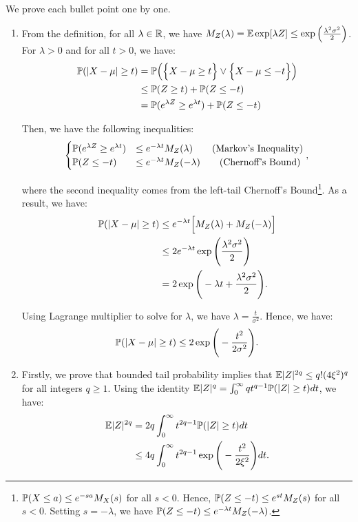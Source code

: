\begin{proof*}
	We prove each bullet point one by one.
	\begin{enumerate}[label=(\roman*)]
		\item From the definition, for all $\lambda\in\mathbb{R}$, we have $M_Z(\lambda) = \mathbb{E}\exp[\lambda Z] \le \exp\Big( \frac{\lambda^2\sigma^2}{2} \Big)$. For $\lambda>0$ and for all $t>0$, we have:
		\begin{align*}
			\mathbb{P}(|X-\mu| \ge t) &= \mathbb{P}\Big( \Big\{ X - \mu \ge t \Big\} \vee \Big\{ X - \mu \le -t \Big\} \Big) \\
			&\le \mathbb{P}(Z \ge t) + \mathbb{P}(Z\le -t) \\
			&= \mathbb{P}(e^{\lambda Z} \ge e^{\lambda t}) + \mathbb{P}(Z \le -t)
		\end{align*} 

		\noindent Then, we have the following inequalities:
		\begin{align*}
			\begin{cases}
				\mathbb{P}(e^{\lambda Z} \ge e^{\lambda t}) &\le e^{-\lambda t}M_Z(\lambda) \qquad \text{(Markov's Inequality)} \\
				\mathbb{P}(Z \le -t) &\le e^{-\lambda t} M_Z(-\lambda) \qquad \text{(Chernoff's Bound)}
			\end{cases},
		\end{align*} 

		\noindent where the second inequality comes from the left-tail Chernoff's Bound\footnote{$\mathbb{P}(X\le a)\le e^{-sa}M_X(s)$ for all $s<0$. Hence, $\mathbb{P}(Z\le -t)\le e^{st}M_Z(s)$ for all $s<0$. Setting $s=-\lambda$, we have $\mathbb{P}(Z\le -t) \le e^{-\lambda t}M_Z(-\lambda)$.}. As a result, we have:
		\begin{align*}
			\mathbb{P}(|X-\mu|\ge t) &\le e^{-\lambda t}\Big[ M_Z(\lambda) + M_Z(-\lambda) \Big] \\
				&\le 2e^{-\lambda t} \exp\Bigg( \frac{\lambda^2\sigma^2}{2} \Bigg) \\
				&= 2\exp\Bigg( -\lambda t + \frac{\lambda^2\sigma^2}{2} \Bigg).
		\end{align*} 

		\noindent Using Lagrange multiplier to solve for $\lambda$, we have $\lambda=\frac{t}{\sigma^2}$. Hence, we have:
		\begin{align*}
			\mathbb{P}(|X-\mu| \ge t) \le 2\exp\Bigg( -\frac{t^2}{2\sigma^2} \Bigg).	
		\end{align*} 

		\item Firstly, we prove that bounded tail probability implies that $\mathbb{E}|Z|^{2q} \le q!(4\xi^2)^q$ for all integers $q\ge1$. Using the identity $\mathbb{E}|Z|^q = \int_0^\infty qt^{q-1}\mathbb{P}(|Z|\ge t)dt$, we have:
	    \begin{align*}
	        \mathbb{E}|Z|^{2q} &= 2q\int_0^\infty t^{2q-1}\mathbb{P}(|Z|\ge t)dt \\
	            &\le 4q\int_0^\infty t^{2q-1}\exp\Bigg( -\frac{t^2}{2\xi^2} \Bigg)dt.
	    \end{align*}


\end{enumerate}
\end{proof*}
